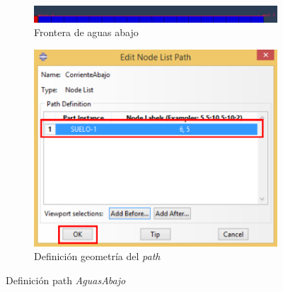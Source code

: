 \begin{itemize}
\begin{figure}[!h]
    \begin{subfigure}[!h]{0.60\textwidth}
      \includegraphics[width=\textwidth]{./body/images/post09}
      \caption{Frontera de aguas abajo}
      \label{post09}
    \end{subfigure}%
    \begin{subfigure}[!h]{0.40\textwidth}
      \includegraphics[width=\textwidth]{./body/images/post10.pdf}
      \caption{Definición geometría del \textit{path}}
      \label{post10}
    \end{subfigure}%
    \caption{Definición path \textit{AguasAbajo}}
  \end{figure}


\end{itemize}

